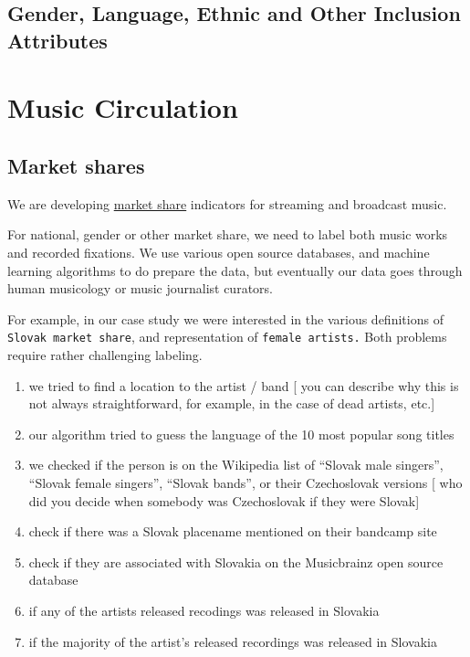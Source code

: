 \documentclass[
  a4paper,
  openany, a4paper, oneside]{book}
\providecommand{\tightlist}{%
  \setlength{\itemsep}{0pt}\setlength{\parskip}{0pt}}
\begin{document}
\hypertarget{gender-language-ethnic-and-other-inclusion-attributes}{%
\subsection{Gender, Language, Ethnic and Other Inclusion Attributes}\label{gender-language-ethnic-and-other-inclusion-attributes}}

\hypertarget{music-circulation}{%
\section{Music Circulation}\label{music-circulation}}

\hypertarget{market-shares}{%
\subsection{Market shares}\label{market-shares}}

We are developing \href{https://data.music.dataobservatory.eu/music-diversity.html\#cross-border-circulation-of-works}{market share} indicators for streaming and broadcast music.

For national, gender or other market share, we need to label both music works and recorded fixations. We use various open source databases, and machine learning algorithms to do prepare the data, but eventually our data goes through human musicology or music journalist curators.

For example, in our case study we were interested in the various definitions of \texttt{Slovak\ market\ share}, and representation of \texttt{female\ artists.} Both problems require rather challenging labeling.

\begin{enumerate}
\def\labelenumi{\alph{enumi})}
\tightlist
\item
  we tried to find a location to the artist / band {[} you can describe why this is not always straightforward, for example, in the case of dead artists, etc.{]}
\item
  our algorithm tried to guess the language of the 10 most popular song titles
\item
  we checked if the person is on the Wikipedia list of ``Slovak male singers'', ``Slovak female singers'', ``Slovak bands'', or their Czechoslovak versions {[} who did you decide when somebody was Czechoslovak if they were Slovak{]}
\item
  check if there was a Slovak placename mentioned on their bandcamp site
\item
  check if they are associated with Slovakia on the Musicbrainz open source database
\item
  if any of the artists released recodings was released in Slovakia
\item
  if the majority of the artist's released recordings was released in Slovakia
\end{enumerate}
\end{document}
